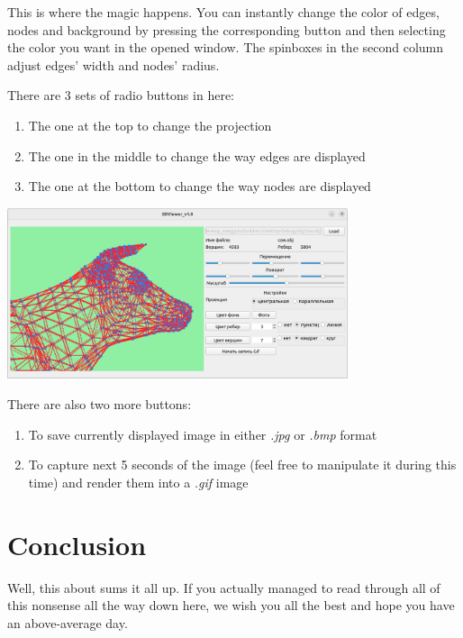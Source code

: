 \documentclass{article}
\begin{document}
This is where the magic happens. You can instantly change the color of edges, nodes and background by pressing the corresponding button
and then selecting the color you want in the opened window. The spinboxes in the second column adjust edges' width and nodes' radius.

\vspace{0.5cm}

There are 3 sets of radio buttons in here:

\begin{enumerate}
    \item The one at the top to change the projection
    \item The one in the middle to change the way edges are displayed
    \item The one at the bottom to change the way nodes are displayed
\end{enumerate}

\includegraphics[width=10cm, keepaspectratio]{3dv_coloursandstuff}

\vspace{0.5cm}

There are also two more buttons:

\begin{enumerate}
    \item To save currently displayed image in either \textit{.jpg} or \textit{.bmp} format
    \item To capture next 5 seconds of the image (feel free to manipulate it during this time) and render them into a \textit{.gif} image 
\end{enumerate}

\pagebreak

\section{Conclusion}

Well, this about sums it all up. If you actually managed to read through all of this nonsense all the way down here,
we wish you all the best and hope you have an above-average day.
\end{document}
